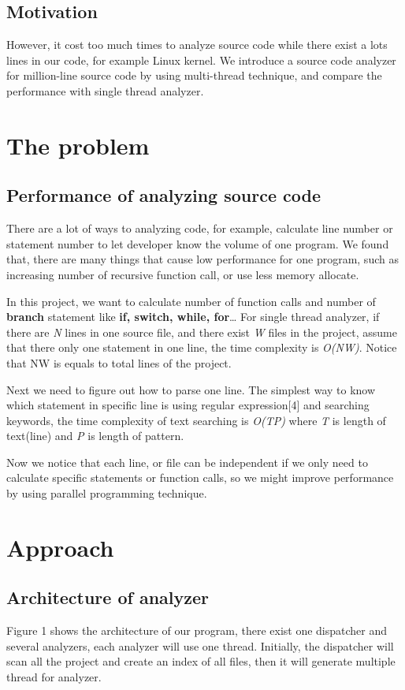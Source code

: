 \documentclass{acm_proc_article-sp}
\begin{document}
\subsection{Motivation}
	However, it cost too much times to analyze source code while there
	exist a lots lines in our code, for example Linux kernel.
	We introduce a source code analyzer for million-line source code
	by using multi-thread technique, and compare the performance with 
	single thread analyzer.


\section{The problem}
\subsection{Performance of analyzing source code}
	There are a lot of ways to analyzing code, for example, calculate
	line number or statement number to let developer know the 
	volume of one program. We found that, there are many things that
	cause low performance for one program, such as increasing number 
	of recursive function call, or use less memory allocate.

	In this project, we want to calculate number of function calls and 
	number of \textbf{branch} statement like \textbf{if, switch, while, for}\ldots
	For single thread analyzer, if there are \textit{N} lines in one source file, 
	and there exist \textit{W} files in the project, assume that there only one 
	statement in one line, the time complexity is \textit{O(NW)}. Notice that
	NW is equals to total lines of the project.

	Next we need to figure out how to parse one line. The simplest way 
	to know which statement in specific line is using regular expression[4] 
	and searching keywords, the time complexity of text searching is 
	\textit{O(TP)} where \textit{T} is length of text(line) and \textit{P} is length
	of pattern.

	Now we notice that each line, or file can be independent 
	if we only need to calculate specific statements or function calls, so
	we might improve performance by using parallel programming technique.

\section{Approach}
\subsection{Architecture of analyzer}
	Figure 1 shows the architecture of our program, there exist one dispatcher 
	and several analyzers, each analyzer will use one thread. Initially, the 
	dispatcher will scan all the project and create an index of all files, then
	it will generate multiple thread for analyzer.
\end{document}

